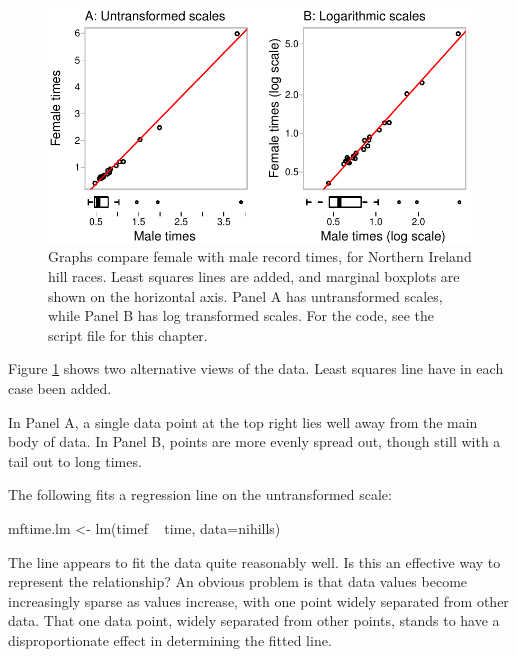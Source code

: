 \begin{figure}
\begin{Schunk}


\centerline{\includegraphics[width=\textwidth]{figs/8-fVSmTimeAB-1} }

\end{Schunk}
  \caption{Graphs compare female with male record times,
  for Northern Ireland hill races.  Least squares lines
    are added, and marginal boxplots are shown on the
    horizontal axis. Panel A
    has untransformed scales, while Panel B has log
    transformed scales. For the code, see the script
    file for this chapter.}\label{fig:nimff}
\end{figure}

Figure \ref{fig:nimff} shows two alternative views of the data.
Least squares line have in each case been added.  

In Panel A, a single data point at the top right lies well
away from the main body of data.  In Panel B, points are more
evenly spread out, though still with a tail out to long times.

The following fits a regression line on the untransformed
scale:
\begin{Schunk}
\begin{Sinput}
mftime.lm <- lm(timef ~ time, data=nihills)
\end{Sinput}
\end{Schunk}

The line appears to fit the data quite reasonably well. Is this an
effective way to represent the relationship?  An obvious problem is
that data values become increasingly sparse as
values increase, with one point widely separated from other data.
That one data point, widely separated from other points, stands
to have a disproportionate effect in determining the fitted line.

